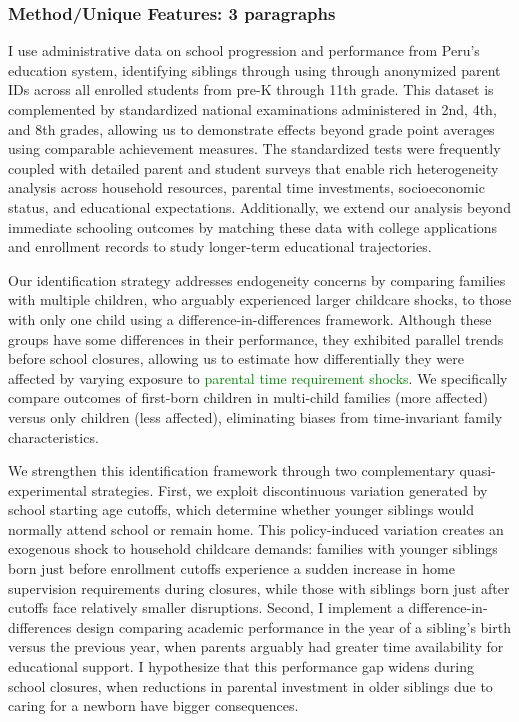 
\subsubsection{Method/Unique Features: 3 paragraphs}

I use administrative data on school progression and performance from Peru's education system, identifying siblings through using through anonymized parent IDs across all enrolled students from pre-K through 11th grade. This dataset is complemented by standardized national examinations administered in 2nd, 4th, and 8th grades, allowing us to demonstrate effects beyond grade point averages using comparable achievement measures. The standardized tests were frequently coupled with detailed parent and student surveys that enable rich heterogeneity analysis across household resources, parental time investments, socioeconomic status, and educational expectations. Additionally, we extend our analysis beyond immediate schooling outcomes by matching these data with college applications and enrollment records to study longer-term educational trajectories.

Our identification strategy addresses endogeneity concerns by comparing families with multiple children, who arguably experienced larger childcare shocks, to those with only one child using a difference-in-differences framework. Although these groups have some differences in their performance, they exhibited parallel trends before school closures, allowing us to estimate how differentially they were affected by varying exposure to \textcolor{green}{parental time requirement shocks}. We specifically compare outcomes of first-born children in multi-child families (more affected) versus only children (less affected), eliminating biases from time-invariant family characteristics. 

We strengthen this identification framework through two complementary quasi-experimental strategies. First, we exploit discontinuous variation generated by school starting age cutoffs, which determine whether younger siblings would normally attend school or remain home. This policy-induced variation creates an exogenous shock to household childcare demands: families with younger siblings born just before enrollment cutoffs experience a sudden increase in home supervision requirements during closures, while those with siblings born just after cutoffs face relatively smaller disruptions. Second, I implement a difference-in-differences design comparing academic performance in the year of a sibling's birth versus the previous year, when parents arguably had greater time availability for educational support. I hypothesize that this performance gap widens during school closures, when reductions in parental investment in older siblings due to caring for a newborn have bigger consequences.


